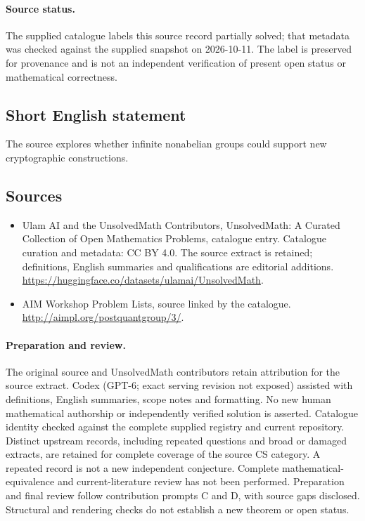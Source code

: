 \documentclass[11pt]{article}
\begin{document}
\paragraph{Source status.}
The supplied catalogue labels this source record partially solved; that metadata was checked against the supplied snapshot on 2026-10-11. The label is preserved for provenance and is not an independent verification of present open status or mathematical correctness.
\subsection{Short English statement}
The source explores whether infinite nonabelian groups could support new cryptographic constructions.
\subsection{Sources}
\begin{itemize}
\item[\hypertarget{source:statement:1}{S1}] Ulam AI and the UnsolvedMath Contributors, UnsolvedMath: A Curated Collection of Open Mathematics Problems, catalogue entry. Catalogue curation and metadata: CC BY 4.0. The source extract is retained; definitions, English summaries and qualifications are editorial additions.
\url{https://huggingface.co/datasets/ulamai/UnsolvedMath}.
\item[\hypertarget{source:statement:2}{S2}] AIM Workshop Problem Lists, source linked by the catalogue.
\url{http://aimpl.org/postquantgroup/3/}.
\end{itemize}
\paragraph{Preparation and review.}
The original source and UnsolvedMath contributors retain attribution for the source extract. Codex (GPT-6; exact serving revision not exposed) assisted with definitions, English summaries, scope notes and formatting. No new human mathematical authorship or independently verified solution is asserted. Catalogue identity checked against the complete supplied registry and current repository. Distinct upstream records, including repeated questions and broad or damaged extracts, are retained for complete coverage of the source CS category. A repeated record is not a new independent conjecture. Complete mathematical-equivalence and current-literature review has not been performed. Preparation and final review follow contribution prompts C and D, with source gaps disclosed. Structural and rendering checks do not establish a new theorem or open status.
\label{end:statement}
\end{document}
